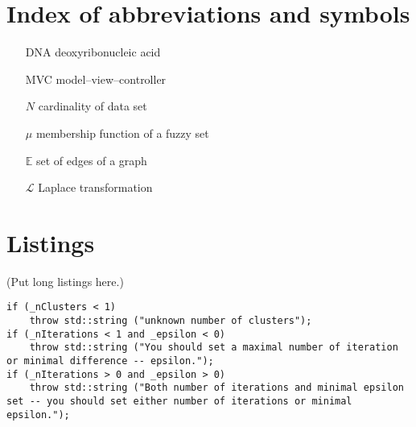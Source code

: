 \documentclass[a4paper,twoside,12pt]{book}
\begin{document}
\begin{appendices}


\chapter{Index of abbreviations and symbols}

\begin{itemize}
\item[DNA] deoxyribonucleic acid
\item[MVC] model--view--controller
\item[$N$] cardinality of data set
\item[$\mu$] membership function of a fuzzy set
\item[$\mathbb{E}$] set of edges of a graph
\item[$\mathcal{L}$] Laplace transformation
\end{itemize}


\chapter{Listings}

(Put long listings here.)

\begin{lstlisting}
if (_nClusters < 1)
	throw std::string ("unknown number of clusters");
if (_nIterations < 1 and _epsilon < 0)
	throw std::string ("You should set a maximal number of iteration or minimal difference -- epsilon.");
if (_nIterations > 0 and _epsilon > 0)
	throw std::string ("Both number of iterations and minimal epsilon set -- you should set either number of iterations or minimal epsilon.");
\end{lstlisting}





\end{appendices}
\end{document}
